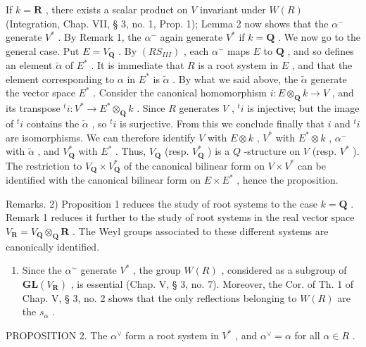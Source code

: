If \(k = \mathbf{R}\) , there exists a scalar product on \(V\) invariant under \(W(R)\) (Integration, Chap. VII, § 3, no. 1, Prop. 1); Lemma 2 now shows that the \(\alpha^{-}\) generate \(V^{*}\) . By Remark 1, the \(\alpha^{-}\) again generate \(V^{*}\) if \(k = \mathbf{Q}\) . We now go to the general case. Put \(E = V_{\mathbf{Q}}\) . By \((RS_{III})\) , each \(\alpha^{-}\) maps \(E\) to \(\mathbf{Q}\) , and so defines an element \(\tilde{\alpha}\) of \(E^{*}\) . It is immediate that \(R\) is a root system in \(E\) , and that the element corresponding to \(\alpha\) in \(E^{*}\) is \(\tilde{\alpha}\) . By what we said above, the \(\tilde{\alpha}\) generate the vector space \(E^{*}\) . Consider the canonical homomorphism \(i: E \otimes_{\mathbf{Q}} k \to V\) , and its transpose \({}^{t}i: V^{*} \to E^{*} \otimes_{\mathbf{Q}} k\) . Since \(R\) generates \(V\) , \({}^{t}i\) is injective; but the image of \({}^{t}i\) contains the \(\tilde{\alpha}\) , so \({}^{t}i\) is surjective. From this we conclude finally that \(i\) and \({}^{t}i\) are isomorphisms. We can therefore identify \(V\) with \(E \otimes k\) , \(V^{*}\) with \(E^{*} \otimes k\) , \(\alpha^{-}\) with \(\tilde{\alpha}\) , and \(V_{\mathbf{Q}}^{*}\) with \(E^{*}\) . Thus, \(V_{\mathbf{Q}}\) (resp. \(V_{\mathbf{Q}}^{*}\) ) is a \(Q\) -structure on \(V\) (resp. \(V^{*}\) ). The restriction to \(V_{\mathbf{Q}} \times V_{\mathbf{Q}}^{*}\) of the canonical bilinear form on \(V \times V^{*}\) can be identified with the canonical bilinear form on \(E \times E^{*}\) , hence the proposition.

Remarks. 2) Proposition 1 reduces the study of root systems to the case \(k = \mathbf{Q}\) . Remark 1 reduces it further to the study of root systems in the real vector space \(V_{\mathbf{R}} = V_{\mathbf{Q}} \otimes_{\mathbf{Q}} \mathbf{R}\) . The Weyl groups associated to these different systems are canonically identified.

\begin{enumerate}
\def\labelenumi{\arabic{enumi})}
\setcounter{enumi}{2}
\tightlist
\item
  Since the \(\alpha^{\sim}\) generate \(V^{*}\) , the group \(W(R)\) , considered as a subgroup of \(\mathbf{GL}(V_{\mathbf{R}})\) , is essential (Chap. V, § 3, no. 7). Moreover, the Cor. of Th. 1 of Chap. V, § 3, no. 2 shows that the only reflections belonging to \(W(R)\) are the \(s_{\alpha}\) .
\end{enumerate}

PROPOSITION 2. The \(\alpha^{\vee}\) form a root system in \(V^{*}\) , and \(\alpha^{\vee} = \alpha\) for all \(\alpha \in R\) .

